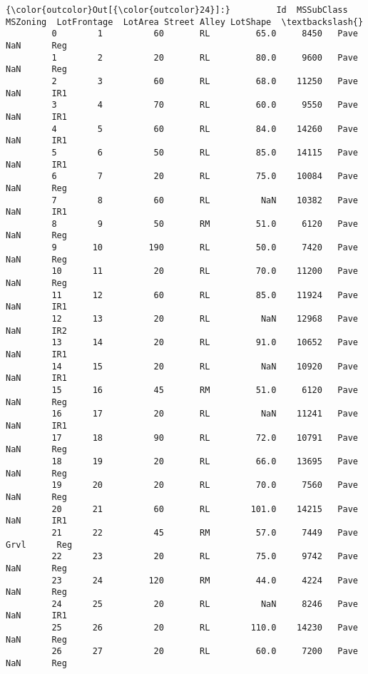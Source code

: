 \documentclass[11pt]{article}
\begin{document}
\begin{Verbatim}[commandchars=\\\{\}]
{\color{outcolor}Out[{\color{outcolor}24}]:}         Id  MSSubClass MSZoning  LotFrontage  LotArea Street Alley LotShape  \textbackslash{}
         0        1          60       RL         65.0     8450   Pave   NaN      Reg   
         1        2          20       RL         80.0     9600   Pave   NaN      Reg   
         2        3          60       RL         68.0    11250   Pave   NaN      IR1   
         3        4          70       RL         60.0     9550   Pave   NaN      IR1   
         4        5          60       RL         84.0    14260   Pave   NaN      IR1   
         5        6          50       RL         85.0    14115   Pave   NaN      IR1   
         6        7          20       RL         75.0    10084   Pave   NaN      Reg   
         7        8          60       RL          NaN    10382   Pave   NaN      IR1   
         8        9          50       RM         51.0     6120   Pave   NaN      Reg   
         9       10         190       RL         50.0     7420   Pave   NaN      Reg   
         10      11          20       RL         70.0    11200   Pave   NaN      Reg   
         11      12          60       RL         85.0    11924   Pave   NaN      IR1   
         12      13          20       RL          NaN    12968   Pave   NaN      IR2   
         13      14          20       RL         91.0    10652   Pave   NaN      IR1   
         14      15          20       RL          NaN    10920   Pave   NaN      IR1   
         15      16          45       RM         51.0     6120   Pave   NaN      Reg   
         16      17          20       RL          NaN    11241   Pave   NaN      IR1   
         17      18          90       RL         72.0    10791   Pave   NaN      Reg   
         18      19          20       RL         66.0    13695   Pave   NaN      Reg   
         19      20          20       RL         70.0     7560   Pave   NaN      Reg   
         20      21          60       RL        101.0    14215   Pave   NaN      IR1   
         21      22          45       RM         57.0     7449   Pave  Grvl      Reg   
         22      23          20       RL         75.0     9742   Pave   NaN      Reg   
         23      24         120       RM         44.0     4224   Pave   NaN      Reg   
         24      25          20       RL          NaN     8246   Pave   NaN      IR1   
         25      26          20       RL        110.0    14230   Pave   NaN      Reg   
         26      27          20       RL         60.0     7200   Pave   NaN      Reg   

\end{Verbatim}
\end{document}
